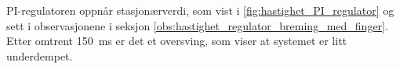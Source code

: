 PI-regulatoren oppnår stasjonærverdi, som vist i \autoref{fig:hastighet_PI_regulator} og sett i observasjonene i seksjon \ref{obs:hastighet_regulator_breming_med_finger}. Etter omtrent \SI{150}{\milli\second} er det et oversving, som viser at systemet er litt underdempet. 


